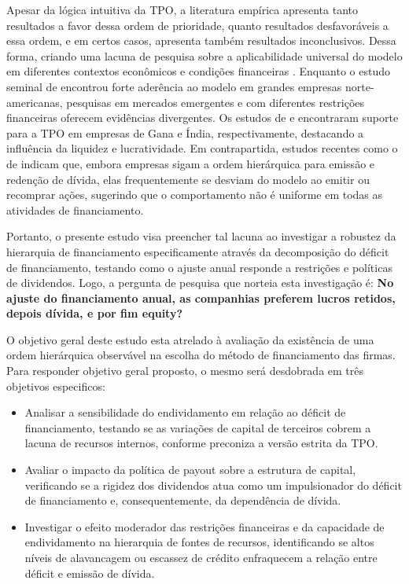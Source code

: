 \documentclass[a4paper,12pt]{article}
\begin{document}
Apesar da lógica intuitiva da TPO, a literatura empírica apresenta tanto resultados a favor dessa ordem de prioridade, quanto resultados desfavoráveis a essa ordem, e em certos casos, apresenta também resultados inconclusivos. Dessa forma, criando uma lacuna de pesquisa sobre a aplicabilidade universal do modelo em diferentes contextos econômicos e condições financeiras \cite{Singh2025, Yildirim2021}. Enquanto o estudo seminal de  encontrou forte aderência ao modelo em grandes empresas norte-americanas, pesquisas em mercados emergentes e com diferentes restrições financeiras oferecem evidências divergentes. Os estudos de  e  encontraram suporte para a TPO em empresas de Gana e Índia, respectivamente, destacando a influência da liquidez e lucratividade. Em contrapartida, estudos recentes como o de  indicam que, embora empresas sigam a ordem hierárquica para emissão e redenção de dívida, elas frequentemente se desviam do modelo ao emitir ou recomprar ações, sugerindo que o comportamento não é uniforme em todas as atividades de financiamento.

Portanto, o presente estudo visa preencher tal lacuna ao investigar a robustez da hierarquia de financiamento especificamente através da decomposição do déficit de financiamento, testando como o ajuste anual responde a restrições e políticas de dividendos. Logo, a pergunta de pesquisa que norteia esta investigação é: \textbf{No ajuste do financiamento anual, as companhias preferem lucros retidos, depois dívida, e por fim equity?} 

O objetivo geral deste estudo esta atrelado à avaliação da existência de uma ordem hierárquica observável na escolha do método de financiamento das firmas. Para responder objetivo geral proposto, o mesmo será desdobrada em três objetivos especificos:

\begin{itemize}
    \item Analisar a sensibilidade do endividamento em relação ao déficit de financiamento, testando se as variações de capital de terceiros cobrem a lacuna de recursos internos, conforme preconiza a versão estrita da TPO.
    \item Avaliar o impacto da política de payout sobre a estrutura de capital, verificando se a rigidez dos dividendos atua como um impulsionador do déficit de financiamento e, consequentemente, da dependência de dívida.
    \item Investigar o efeito moderador das restrições financeiras e da capacidade de endividamento na hierarquia de fontes de recursos, identificando se altos níveis de alavancagem ou escassez de crédito enfraquecem a relação entre déficit e emissão de dívida.
\end{itemize}
\end{document}
